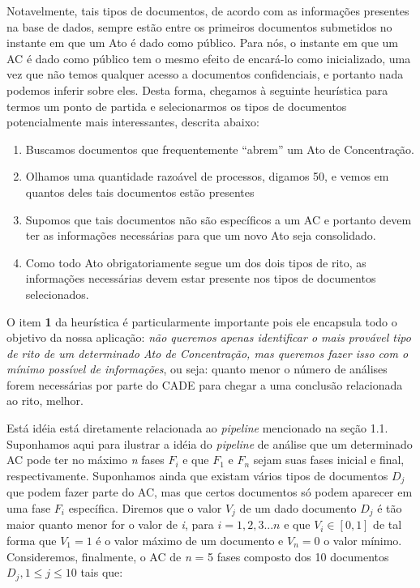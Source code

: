 \documentclass[11pt]{report}
\newcommand{\quotes}[1]{``#1''}
\begin{document}
Notavelmente, tais tipos de documentos, de acordo com as informações presentes na base de dados, sempre estão entre os primeiros documentos submetidos no instante em que um
Ato é dado como público. Para nós, o instante em que um AC é dado como público tem o mesmo efeito de encará-lo como inicializado, uma vez que não temos qualquer acesso
a documentos confidenciais, e portanto nada podemos inferir sobre eles.
Desta forma, chegamos à seguinte heurística para termos um ponto de partida e selecionarmos os tipos de documentos potencialmente mais interessantes, descrita abaixo:

\begin{enumerate}[label=\textbf{\arabic*.}]
\item Buscamos documentos que frequentemente \quotes{abrem} um Ato de Concentração.
\item Olhamos uma quantidade razoável de processos, digamos 50, e vemos em quantos deles tais documentos estão presentes
\item Supomos que tais documentos não são específicos a um AC e portanto devem ter as informações necessárias para que um novo Ato seja consolidado.
\item Como todo Ato obrigatoriamente segue um dos dois tipos de rito, as informações necessárias devem estar presente nos tipos de documentos selecionados.
\end{enumerate}

O item \textbf{1} da heurística é particularmente importante pois ele encapsula todo o objetivo da nossa aplicação: \textit{não queremos apenas identificar o mais provável tipo de rito
de um determinado Ato de Concentração, mas queremos fazer isso com o mínimo possível de informações}, ou seja: quanto menor o número de análises forem
necessárias por parte do CADE para chegar a uma conclusão relacionada ao rito, melhor.

Está idéia está diretamente relacionada ao \textit{pipeline} mencionado na seção 1.1. Suponhamos aqui para ilustrar a idéia do
\textit{pipeline} de análise que um determinado AC pode ter no máximo \textit{n} fases $F_i$ e que $F_1$ e $F_n$ sejam suas fases inicial e final, respectivamente.
Suponhamos ainda que existam vários tipos de documentos $D_j$ que podem fazer parte do AC, mas que certos documentos só podem aparecer em uma fase $F_i$ específica.
Diremos que o valor $V_j$ de um dado documento $D_j$ é tão maior quanto menor for o valor de \textit{i}, para $i = 1, 2, 3 ... n$ e que $V_i \in [0, 1]$ de tal
forma que $V_1 = 1$ é o valor máximo de um documento e $V_n = 0$ o valor mínimo.
Consideremos, finalmente, o AC de \textit{n} = 5 fases composto dos 10 documentos $D_j, 1 \leq j \leq 10$ tais que:
\end{document}
